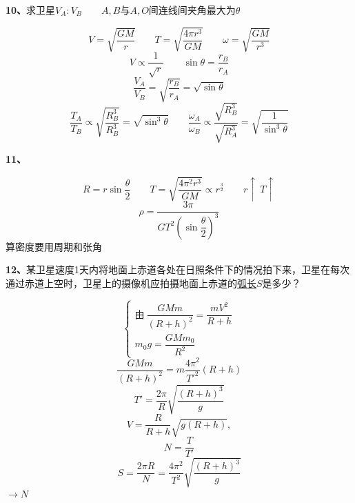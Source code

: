 \begin{problem}[10]
\textbf{10、}求卫星$V_A:V_B$　　$A,B$与$A,O$间连线间夹角最大为$\theta$
\begin{solution}
\[ V=\sqrt{\dfrac{GM}{r}}\qquad T=\sqrt{\dfrac{4\pi r^3}{GM}}\qquad \omega=\sqrt{\dfrac{GM}{r^3}} \] %
\[ V\propto\dfrac{1}{\sqrt{r}}\qquad \sin\theta=\dfrac{r_B}{r_A} \]
\[ \dfrac{V_A}{V_B}=\sqrt{\dfrac{r_B}{r_A}}=\sqrt{\sin\theta} \]
\[ \dfrac{T_A}{T_B}\propto\sqrt{\dfrac{R_B^3}{R_B^3}}=\sqrt{\sin^3\theta}\qquad \dfrac{\omega_A}{\omega_B}\propto\dfrac{\sqrt{R_B^3}}{\sqrt{R_A^3}}=\sqrt{\dfrac{1}{\sin^3\theta}} \] %
\end{solution}
\end{problem}
\begin{problem}[11]
\textbf{11、}
\begin{solution}
\[ R=r\sin\dfrac{\theta}{2}\qquad T=\sqrt{\dfrac{4\pi^2r^3}{GM}}\propto r^{\frac{3}{2}}\qquad r\uparrow\ T\uparrow \] %
\[ \rho=\dfrac{3\pi}{GT^2\left(\sin\dfrac{\theta}{2}\right)^3} \]
算密度要用周期和张角
\end{solution}
\end{problem}
\begin{problem}[12]
\textbf{12、}某卫星速度1天内将地面上赤道各处在日照条件下的情况拍下来，卫星在每次通过赤道上空时，卫星上的摄像机应拍摄地面上赤道的\uline{弧长}$S$是多少？%
\begin{solution}
\[ \begin{cases}
\text{由}\ \dfrac{GMm}{(R+h)^2}=\dfrac{mV^2}{R+h}\\[4pt]
m_0g=\dfrac{GMm_0}{R^2}
\end{cases} \]
\[ \dfrac{GMm}{(R+h)^2}=m\dfrac{4\pi^2}{T'^2}(R+h) \]
\[ T'=\dfrac{2\pi}{R}\sqrt{\dfrac{(R+h)^3}{g}} \]
\[ V=\dfrac{R}{R+h}\sqrt{g(R+h)}, \]
\[ N=\dfrac{T}{T'} \]
\[ S=\dfrac{2\pi R}{N}=\dfrac{4\pi^2}{T^2}\sqrt{\dfrac{(R+h)^3}{g}} \] %
$\to N$%
\end{solution}
\end{problem}
